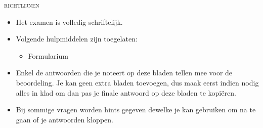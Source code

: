 \usepackage{booktabs}






\begin{examguidelines}
  \begin{center}
    \textsc{\Huge richtlijnen}
  \end{center}
  \vskip1cm%
  \Large
  \begin{itemize}
    \item Het examen is volledig schriftelijk.
    \item Volgende hulpmiddelen zijn toegelaten:
          \begin{itemize}
            \item Formularium
          \end{itemize}
    \item Enkel de antwoorden die je noteert op deze bladen
          tellen mee voor de beoordeling. Je kan geen extra bladen
          toevoegen, dus maak eerst indien nodig alles in klad om dan pas
          je finale antwoord op deze bladen te kopi\"eren.
    \item Bij sommige vragen worden hints gegeven dewelke je kan gebruiken
          om na te gaan of je antwoorden kloppen.
  \end{itemize}
\end{examguidelines}



% 
% 
% 

% 
% 
% 
% 

% 
% 
% 
% 

% 
% 
% 




